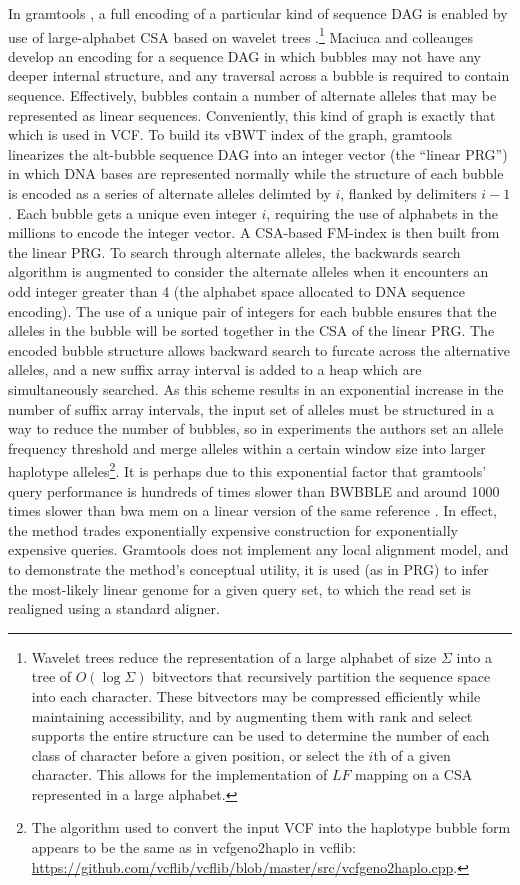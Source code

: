 In gramtools \cite{maciuca2016natural}, a full encoding of a particular kind of sequence DAG is enabled by use of large-alphabet CSA based on wavelet trees \cite{grossi2003high}.\footnote{Wavelet trees reduce the representation of a large alphabet of size $\Sigma$ into a tree of $O(\log{\Sigma})$ bitvectors that recursively partition the sequence space into each character.
These bitvectors may be compressed efficiently while maintaining accessibility, and by augmenting them with rank and select supports the entire structure can be used to determine the number of each class of character before a given position, or select the $i$th of a given character.
This allows for the implementation of $LF$ mapping on a CSA represented in a large alphabet.}
Maciuca and colleauges develop an encoding for a sequence DAG in which bubbles may not have any deeper internal structure, and any traversal across a bubble is required to contain sequence.
Effectively, bubbles contain a number of alternate alleles that may be represented as linear sequences.
Conveniently, this kind of graph is exactly that which is used in VCF.
To build its vBWT index of the graph, gramtools linearizes the alt-bubble sequence DAG into an integer vector (the ``linear PRG'') in which DNA bases are represented normally while the structure of each bubble is encoded as a series of alternate alleles delimted by $i$, flanked by delimiters $i-1$.
Each bubble gets a unique even integer $i$, requiring the use of alphabets in the millions to encode the integer vector.
A CSA-based FM-index is then built from the linear PRG.
To search through alternate alleles, the backwards search algorithm is augmented to consider the alternate alleles when it encounters an odd integer greater than 4 (the alphabet space allocated to DNA sequence encoding).
The use of a unique pair of integers for each bubble ensures that the alleles in the bubble will be sorted together in the CSA of the linear PRG.
The encoded bubble structure allows backward search to furcate across the alternative alleles, and a new suffix array interval is added to a heap which are simultaneously searched.
As this scheme results in an exponential increase in the number of suffix array intervals, the input set of alleles must be structured in a way to reduce the number of bubbles, so in experiments the authors set an allele frequency threshold and merge alleles within a certain window size into larger haplotype alleles\footnote{The algorithm used to convert the input VCF into the haplotype bubble form appears to be the same as in vcfgeno2haplo in vcflib: \url{https://github.com/vcflib/vcflib/blob/master/src/vcfgeno2haplo.cpp}.}.
It is perhaps due to this exponential factor that gramtools' query performance is hundreds of times slower than BWBBLE and around 1000 times slower than bwa mem on a linear version of the same reference \cite{maciuca2016natural}.
In effect, the method trades exponentially expensive construction for exponentially expensive queries.
Gramtools does not implement any local alignment model, and to demonstrate the method's conceptual utility, it is used (as in PRG) to infer the most-likely linear genome for a given query set, to which the read set is realigned using a standard aligner.

